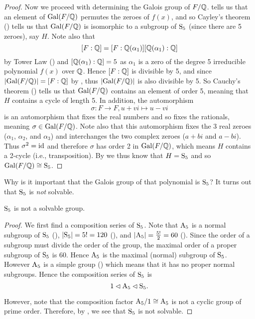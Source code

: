 \begin{proof}
    Now we proceed with determining the Galois group of $F/\mathbb{Q}$.  tells us that an element of $\mathrm{Gal}(F/\mathbb{Q})$ permutes the zeroes of $f(x)$, and so Cayley's theorem () tells us that $\mathrm{Gal}(F/\mathbb{Q})$ is isomorphic to a subgroup of $\mathrm{S}_{5}$ (since there are 5 zeroes), say $H$. Note also that
    \[
        [F:\mathbb{Q}] = [F:\mathbb{Q}(\alpha_1)][\mathbb{Q}(\alpha_1):\mathbb{Q}]
    \]
    by Tower Law () and $[\mathbb{Q}(\alpha_1):\mathbb{Q}] = 5$ as $\alpha_1$ is a zero of the degree 5 irreducible polynomial $f(x)$ over $\mathbb{Q}$. Hence $[F:\mathbb{Q}]$ is divisible by 5, and since $|\mathrm{Gal}(F/\mathbb{Q})| = [F:\mathbb{Q}]$ by , thus $|\mathrm{Gal}(F/\mathbb{Q})|$ is also divisible by 5. So Cauchy's theorem () tells us that $\mathrm{Gal}(F/\mathbb{Q})$ contains an element of order 5, meaning that $H$ contains a cycle of length 5. In addition, the automorphism
    \[
        \sigma: F \to F, u + vi \mapsto u - vi
    \]
    is an automorphism that fixes the real numbers and so fixes the rationals, meaning $\sigma \in \mathrm{Gal}(F/\mathbb{Q})$. Note also that this automorphism fixes the 3 real zeroes ($\alpha_1$, $\alpha_2$, and $\alpha_3$) and interchanges the two complex zeroes ($a+bi$ and $a-bi$). Thus $\sigma^2 = \mathrm{id}$ and therefore $\sigma$ has order 2 in $\mathrm{Gal}(F/\mathbb{Q})$, which means $H$ contains a 2-cycle (i.e., transposition). By  we thus know that $H = \mathrm{S}_{5}$ and so $\mathrm{Gal}(F/\mathbb{Q}) \cong \mathrm{S}_{5}$.
\end{proof}

Why is it important that the Galois group of that polynomial is $\mathrm{S}_{5}$? It turns out that $\mathrm{S}_{5}$ is \textit{not} solvable.

\begin{proposition}
    $\mathrm{S}_{5}$ is not a solvable group.
\end{proposition}
\begin{proof}
    We first find a composition series of $\mathrm{S}_{5}$. Note that $\mathrm{A}_{5}$ is a normal subgroup of $\mathrm{S}_{5}$ (), $|\mathrm{S}_{5}| = 5! = 120$ (), and $|\mathrm{A}_{5}| = \frac{5!}2 = 60$ (). Since the order of a subgroup must divide the order of the group, the maximal order of a proper subgroup of $\mathrm{S}_{5}$ is 60. Hence $\mathrm{A}_{5}$ is the maximal (normal) subgroup of $\mathrm{S}_{5}$. However $\mathrm{A}_{5}$ is a simple group () which means that it has no proper normal subgroups. Hence the composition series of $\mathrm{S}_{5}$ is
    \[
        1 \lhd \mathrm{A}_{5} \lhd \mathrm{S}_{5}.
    \]
    
    However, note that the composition factor $\mathrm{A}_{5}/1 \cong \mathrm{A}_{5}$ is not a cyclic group of prime order. Therefore, by , we see that $\mathrm{S}_{5}$ is not solvable.
\end{proof}

